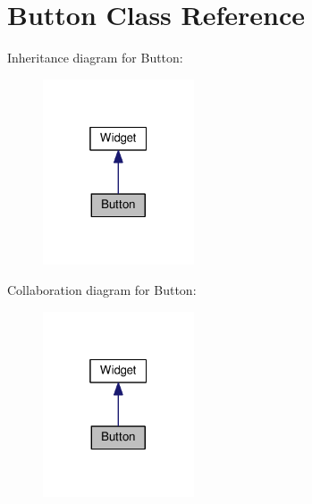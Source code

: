 \hypertarget{class_button}{}\section{Button Class Reference}
\label{class_button}


Inheritance diagram for Button\+:\nopagebreak
\begin{figure}[H]
\begin{center}
\leavevmode
\includegraphics[width=127pt]{class_button__inherit__graph}
\end{center}
\end{figure}


Collaboration diagram for Button\+:\nopagebreak
\begin{figure}[H]
\begin{center}
\leavevmode
\includegraphics[width=127pt]{class_button__coll__graph}
\end{center}
\end{figure}
